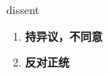 
\begin{frame}
{\huge dissent}
\begin{center}
\begin{enumerate}\Large
  \item \textbf{持异议，不同意}
  \item \textbf{反对正统}
\end{enumerate}
\end{center}
\end{frame}
